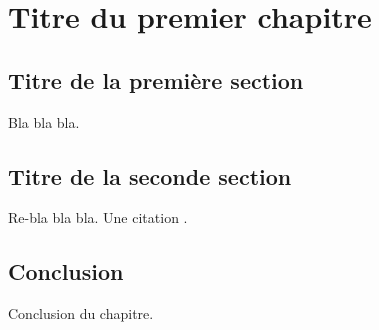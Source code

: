 \chapter{Titre du premier chapitre}
\label{chapitre/titre_premier_chapitre}
\section{Titre de la première section}
Bla bla bla.
\section{Titre de la seconde section}
Re-bla bla bla.
Une citation \cite{bregier2004mas}.

\section{Conclusion}
Conclusion du chapitre.

